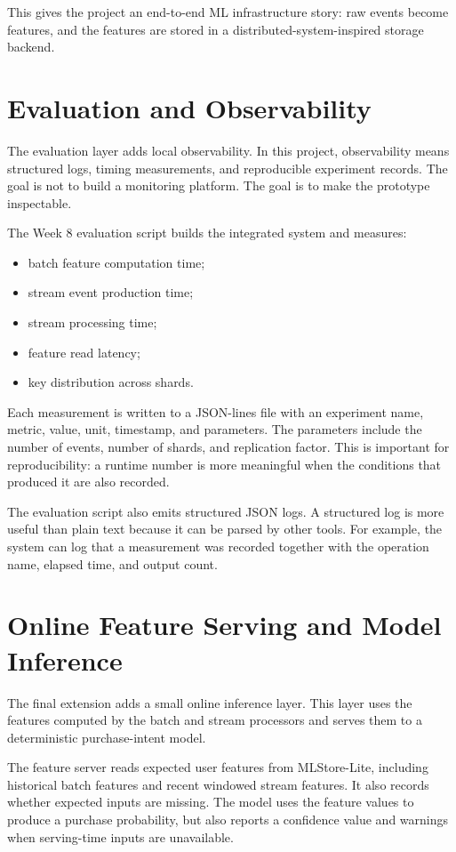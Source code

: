 This gives the project an end-to-end ML infrastructure story: raw events become
features, and the features are stored in a distributed-system-inspired storage
backend.

\section{Evaluation and Observability}

The evaluation layer adds local observability. In this project, observability
means structured logs, timing measurements, and reproducible experiment records.
The goal is not to build a monitoring platform. The goal is to make the
prototype inspectable.

The Week 8 evaluation script builds the integrated system and measures:

\begin{itemize}
    \item batch feature computation time;
    \item stream event production time;
    \item stream processing time;
    \item feature read latency;
    \item key distribution across shards.
\end{itemize}

Each measurement is written to a JSON-lines file with an experiment name,
metric, value, unit, timestamp, and parameters. The parameters include the
number of events, number of shards, and replication factor. This is important
for reproducibility: a runtime number is more meaningful when the conditions
that produced it are also recorded.

The evaluation script also emits structured JSON logs. A structured log is more
useful than plain text because it can be parsed by other tools. For example, the
system can log that a measurement was recorded together with the operation name,
elapsed time, and output count.

\section{Online Feature Serving and Model Inference}

The final extension adds a small online inference layer. This layer uses the
features computed by the batch and stream processors and serves them to a
deterministic purchase-intent model.

The feature server reads expected user features from MLStore-Lite, including
historical batch features and recent windowed stream features. It also records
whether expected inputs are missing. The model uses the feature values to
produce a purchase probability, but also reports a confidence value and warnings
when serving-time inputs are unavailable.

